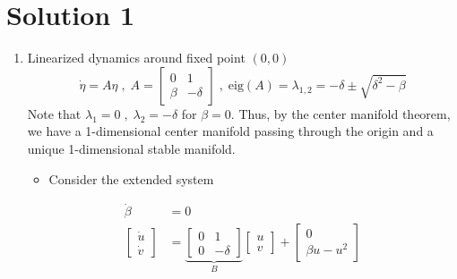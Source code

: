 \documentclass[twoside,10pt,a4paper]{article}
\begin{document}
\section*{Solution 1}
\begin{enumerate}[label=(\alph*)]
\item Linearized dynamics around fixed point $(0,0)$
\begin{equation*}
	\dot{\eta} = A\eta \; , \; A = \begin{bmatrix}
		0 & 1 \\ \beta & -\delta
	\end{bmatrix} \; , \; \text{eig}(A) = \lambda_{1,2} = -\delta \pm \sqrt{\delta^2 - \beta}
\end{equation*}
Note that $\lambda_1 = 0 \; , \; \lambda_2 = -\delta$ for $\beta = 0$. Thus, by the center manifold theorem, we have a 1-dimensional center manifold passing through the origin and a unique 1-dimensional stable manifold.


\begin{itemize}
	\item Consider the extended system
\end{itemize}

\begin{align*}
	\dot{\beta} &= 0 \\
	\begin{bmatrix}
		\dot{u} \\ \dot{v}
	\end{bmatrix}
	&= \underbrace{\begin{bmatrix}
		0 & 1 \\ 0 & -\delta
	\end{bmatrix}}_{B} \begin{bmatrix}
		u \\ v
	\end{bmatrix}
	+
	\begin{bmatrix}
		0 \\ \beta u - u^2
	\end{bmatrix}
\end{align*}


\end{enumerate}
\end{document}
